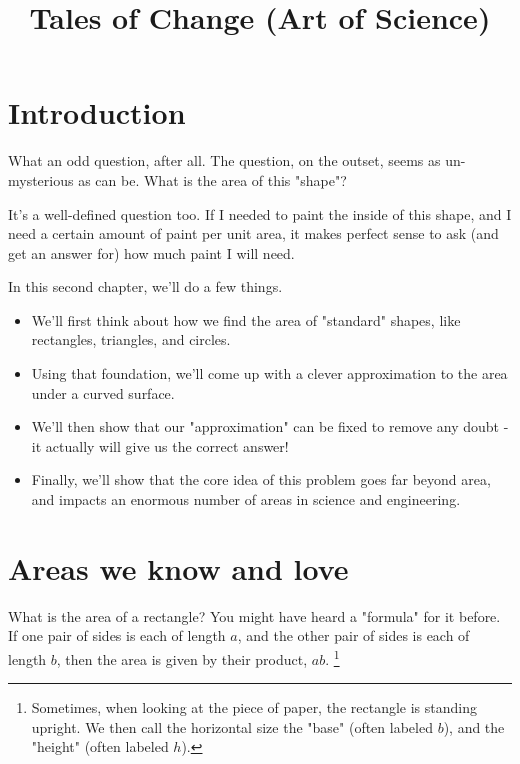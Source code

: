 \documentclass{article}
\title{Tales of Change (Art of Science)}
\date{\vspace{-5ex}}
\begin{document}
\maketitle



\section{Introduction}

What an odd question, after all. The question, on the outset, seems as un-mysterious as can be. What is the area of this "shape"? 

It's a well-defined question too. If I needed to paint the inside of this shape, and I need a certain amount of paint per unit area, it makes perfect sense to ask (and get an answer for) how much paint I will need.


In this second chapter, we'll do a few things. 

\begin{itemize}
\item We'll first think about how we find the area of "standard" shapes, like rectangles, triangles, and circles.
\item Using that foundation, we'll come up with a clever approximation to the area under a curved surface. 
\item We'll then show that our "approximation" can be fixed to remove any doubt - it actually will give us the correct answer!
\item Finally, we'll show that the core idea of this problem goes far beyond area, and impacts an enormous number of areas in science and engineering.
\end{itemize}


\section{Areas we know and love}

What is the area of a rectangle? You might have heard a "formula" for it before. If one pair of sides is each of length $a$, and the other pair of sides is each of length $b$, then the area is given by their product, $ab$. \footnote{Sometimes, when looking at the piece of paper, the rectangle is standing upright. We then call the horizontal size the "base" (often labeled $b$), and the "height" (often labeled $h$).}
\end{document}
